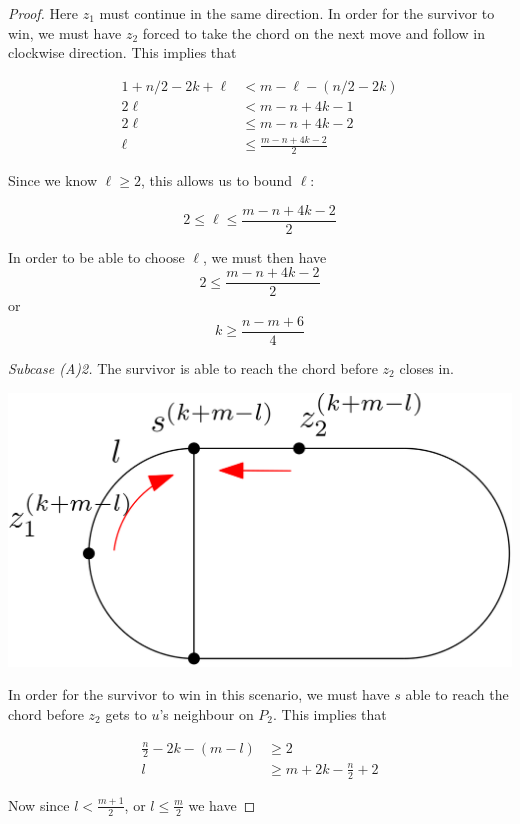 \documentclass[letterpaper, 10pt]{article}
\begin{document}
\begin{proof}
Here $z_1$ must continue in the same direction. In order for the survivor to win, we must have
$z_2$ forced to take the chord on the next move and follow in clockwise direction. This implies that

\begin{align*}
1 + n/2-2k + \ell & < m - \ell - (n/2-2k)   \\
2\ell             & < m -n +4k -1           \\
2\ell             & \leq m - n +4k -2       \\
\ell              & \leq \frac{m-n+4k-2}{2}
\end{align*}

Since we know $\ell \geq 2$, this allows us to bound $\ell$:

\[ 2 \leq \ell \leq \frac{m-n+4k-2}{2} \]

In order to be able to choose $\ell$, we must then have
\[ 2 \leq \frac{m -n + 4k -2}{2} \]
or
\[ k \geq \frac{n-m+6}{4} \]

\emph{Subcase (A)2.} The survivor is able to reach the chord before $z_2$ closes in.

\begin{center}
\includegraphics[scale=0.15]{diagramCaseA2_1}
\end{center}

In order for the survivor to win in this scenario, we must have $s$ able to
reach the chord before $z_2$ gets to $u$'s neighbour on $P_2$. This implies that

\begin{align*}
\frac{n}{2} - 2k - (m-l) & \geq 2                        \\
l                        & \geq m + 2k - \frac{n}{2} + 2
\end{align*}

Now since $l < \frac{m+1}{2}$, or $l \leq \frac{m}{2}$ we have


\end{proof}
\end{document}
